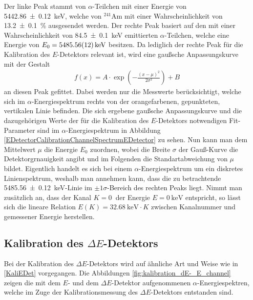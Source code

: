 Der linke Peak stammt von $\alpha$-Teilchen mit einer Energie von \SI{5442,86 +- 0,12}{\kilo\electronvolt}, welche von $^{241}$Am mit einer Wahrscheinlichkeit von \SI{13,2 +- 0,1}{\percent} ausgesendet werden.
Der rechte Peak basiert auf den mit einer Wahrscheinlichkeit von \SI{84,5 +- 0,1}{\kilo\electronvolt} emittierten $\alpha$-Teilchen, welche eine Energie von $E_{0}=\SI{5485,56 +- 0,12}{\kilo\electronvolt}$ besitzen.
Da lediglich der rechte Peak für die Kalibration des $E$-Detektors relevant ist, wird eine gaußsche Anpassungskurve mit der Gestalt
\begin{align} \label{Gaussian}
f(x)=A\cdot\exp\left( -\frac{(x-\mu)^2}{2\sigma ^2}\right) + B
\end{align}
an diesen Peak gefittet.
Dabei werden nur die Messwerte berücksichtigt, welche sich im $\alpha$-Energiespektrum rechts von der orangefarbenen, gepunkteten, vertikalen Linie befinden.
Die sich ergebene gaußsche Anpassungskurve und die dazugehörigen Werte der für die Kalibration des $E$-Detektors notwendigen Fit-Parameter sind im $\alpha$-Energiespektrum in Abbildung \ref{EDetectorCalibrationChannelSpectrumEDetector} zu sehen.
Nun kann man dem Mittelwert $\mu$ die Energie $E_{0}$ zuordnen, wobei die Breite $\sigma$ der Gauß-Kurve die Detektorgrnauigkeit angibt und im Folgenden die Standartabweichung von $\mu$ bildet.
Eigentlich handelt es sich bei einem $\alpha$-Energiespektrum um ein diskretes Linienspektrum, weshalb man annehmen kann, dass die zu betrachtende \SI{5485,56 +- 0,12}{\kilo\electronvolt}-Linie im $\pm 1\sigma$-Bereich des rechten Peaks liegt.
Nimmt man zusätzlich an, dass der Kanal $K=\SI{0}{}$ der Energie $E=\SI{0}{\kilo\electronvolt}$ entspricht, so lässt sich die lineare Relation $E(K) = \SI{32,68}{\kilo\electronvolt} \cdot K$ zwischen Kanalnummer und gemessener Energie herstellen.

\subsection{Kalibration des $\Delta E$-Detektors} \label{KalidEDet}

Bei der Kalibration des $\Delta E$-Detektors wird auf ähnliche Art und Weise wie in \cref{KaliEDet} vorgegangen.
Die Abbildungen \ref{fig:kalibration_dE-_E_channel} zeigen die mit dem $E$- und dem $\Delta E$-Detektor aufgenommenen $\alpha$-Energiespektren, welche im Zuge der Kalibrationsmessung des $\Delta E$-Detektors entstanden sind.

